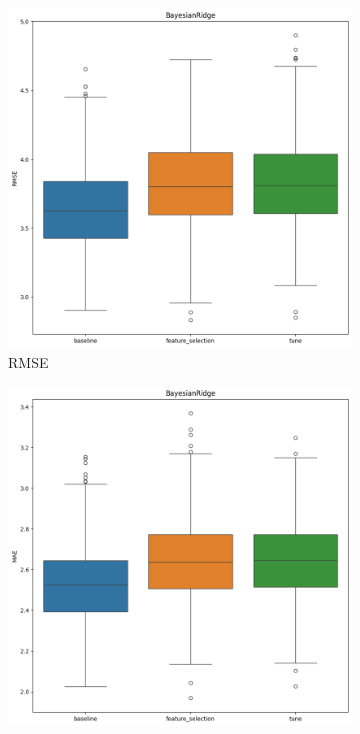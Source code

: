 \documentclass[12pt]{article}
\begin{document}
\begin{figure}[H]
    \centering
    \begin{subfigure}{0.3\textwidth}
        \centering
        \includegraphics[width=\linewidth]{ims/bayesianridge_rmse.png}
        \caption{RMSE}
        \label{fig:bayesianridge_rmse}
    \end{subfigure}
    \begin{subfigure}{0.3\textwidth}
        \centering
        \includegraphics[width=\linewidth]{ims/bayesianridge_mae.png}

\end{subfigure}
\end{figure}
\end{document}
